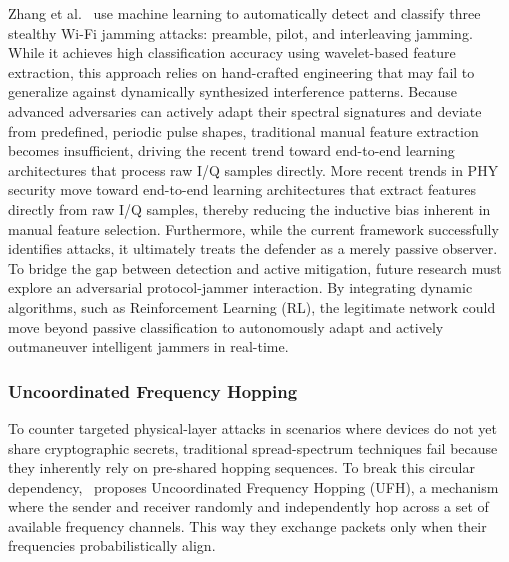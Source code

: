 \documentclass[conference]{IEEEtran}
\newcommand{\adm}[1]{{\color{orange}{[#1]}}}
\newcommand{\rar}[1]{{\color{blue}{[#1]}}}
\begin{document}
Zhang et al.~\cite{zhang2023detection} use machine learning to automatically detect and classify three stealthy Wi-Fi jamming attacks: preamble, pilot, and interleaving jamming.
While it achieves high classification accuracy using wavelet-based feature extraction, this approach relies on hand-crafted engineering that may fail to generalize against %
dynamically synthesized interference patterns. 
Because advanced adversaries can actively adapt their spectral signatures and deviate from predefined, periodic pulse shapes, traditional manual feature extraction becomes insufficient, driving the recent trend toward end-to-end learning architectures that process raw I/Q samples directly.
More recent trends in PHY security move toward end-to-end learning architectures that extract features directly from raw I/Q samples, thereby reducing the inductive bias inherent in manual feature selection. 
Furthermore, while the current framework successfully identifies attacks, it ultimately treats the defender as a merely passive observer.
To bridge the gap between detection and active mitigation, future research must explore an adversarial protocol-jammer interaction.
By integrating dynamic algorithms, such as Reinforcement Learning (RL), the legitimate network could move beyond passive classification to autonomously adapt and actively outmaneuver intelligent jammers in real-time.
\rar{more of jamming detection, we want to focus on jamming attacks}

\subsubsection{Uncoordinated Frequency Hopping}
To counter targeted physical-layer attacks in scenarios where devices do not yet share cryptographic secrets, traditional spread-spectrum techniques fail because they inherently rely on pre-shared hopping sequences.
To break this circular dependency,~\cite{strasser2009novel} proposes Uncoordinated Frequency Hopping (UFH), a mechanism where the sender and receiver randomly and independently hop across a set of available frequency channels.
This way they exchange packets only when their frequencies probabilistically align.
\end{document}
